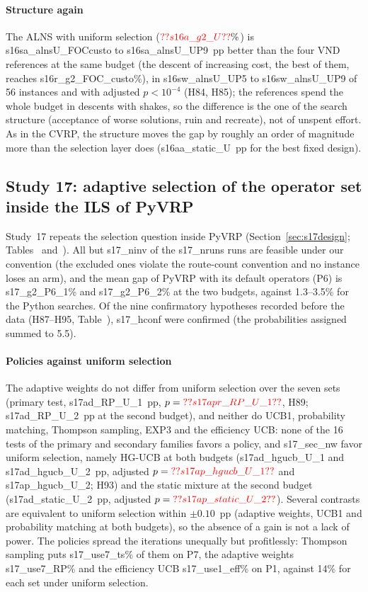 \paragraph{Structure again} The ALNS with uniform selection ($\num{s16a_g2_U}\%$) is \num{s16sa_alnsU_FOCcusto} to \num{s16sa_alnsU_UP9}~pp better than the four VND references at the same budget (the descent of increasing cost, the best of them, reaches \num{s16r_g2_FOC_custo}\%), in \num{s16sw_alnsU_UP5} to \num{s16sw_alnsU_UP9} of 56 instances and with adjusted $p<10^{-4}$ (H84, H85); the references spend the whole budget in descents with shakes, so the difference is the one of the search structure (acceptance of worse solutions, ruin and recreate), not of unspent effort. As in the CVRP, the structure moves the gap by roughly an order of magnitude more than the selection layer does (\num{s16aa_static_U}~pp for the best fixed design).

\subsection{Study 17: adaptive selection of the operator set inside the ILS of PyVRP}\label{sec:s17}
Study~17 repeats the selection question inside PyVRP (Section~\ref{sec:s17design}; Tables~ and~). All but \num{s17_ninv} of the \num{s17_nruns} runs are feasible under our convention (the excluded ones violate the route-count convention and no instance loses an arm), and the mean gap of PyVRP with its default operators (P6) is \num{s17_g2_P6_1}\% and \num{s17_g2_P6_2}\% at the two budgets, against 1.3--3.5\% for the Python searches. Of the nine confirmatory hypotheses recorded before the data (H87--H95, Table~), \num{s17_hconf} were confirmed (the probabilities assigned summed to 5.5).



\paragraph{Policies against uniform selection} The adaptive weights do not differ from uniform selection over the seven sets (primary test, \num{s17ad_RP_U_1}~pp, $p=\num{s17apr_RP_U_1}$, H89; \num{s17ad_RP_U_2}~pp at the second budget), and neither do UCB1, probability matching, Thompson sampling, EXP3 and the efficiency UCB: none of the 16 tests of the primary and secondary families favors a policy, and \num{s17_sec_nw} favor uniform selection, namely HG-UCB at both budgets (\num{s17ad_hgucb_U_1} and \num{s17ad_hgucb_U_2}~pp, adjusted $p=\num{s17ap_hgucb_U_1}$ and \num{s17ap_hgucb_U_2}; H93) and the static mixture at the second budget (\num{s17ad_static_U_2}~pp, adjusted $p=\num{s17ap_static_U_2}$). Several contrasts are equivalent to uniform selection within $\pm0.10$~pp (adaptive weights, UCB1 and probability matching at both budgets), so the absence of a gain is not a lack of power. The policies spread the iterations unequally but profitlessly: Thompson sampling puts \num{s17_use7_ts}\% of them on P7, the adaptive weights \num{s17_use7_RP}\% and the efficiency UCB \num{s17_use1_eff}\% on P1, against 14\% for each set under uniform selection.

